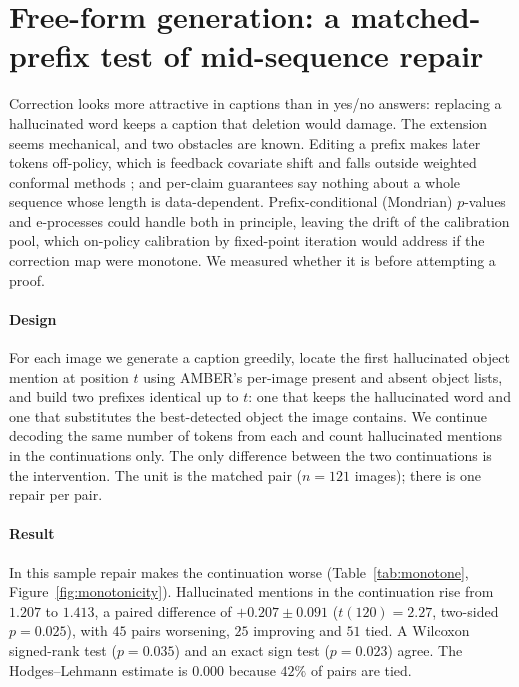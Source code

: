\section{Free-form generation: a matched-prefix test of mid-sequence repair}
\label{sec:sequential}

Correction looks more attractive in captions than in yes/no answers: replacing a hallucinated word keeps a
caption that deletion would damage. The extension seems mechanical, and two obstacles are known. Editing a prefix makes
later tokens off-policy, which is feedback covariate shift \citep{fannjiang2022fcs} and falls outside weighted conformal
methods \citep{tibshirani2019}; and per-claim guarantees say nothing about a whole sequence whose length is
data-dependent. Prefix-conditional (Mondrian) $p$-values and e-processes \citep{waudbysmith2024,ramdas2023} could
handle both in principle, leaving the drift of the calibration pool, which on-policy calibration by fixed-point
iteration would address if the correction map were monotone. We measured whether it is before attempting a proof.

\paragraph{Design}
For each image we generate a caption greedily, locate the first hallucinated object mention at position $t$ using AMBER's
per-image present and absent object lists, and build two prefixes identical up to $t$: one that keeps the hallucinated
word and one that substitutes the best-detected object the image contains. We continue decoding the same number of
tokens from each and count hallucinated mentions in the continuations only. The only difference between the two
continuations is the intervention. The unit is the matched pair ($n=121$ images); there is one repair per pair.

\paragraph{Result}
In this sample repair makes the continuation worse (Table~\ref{tab:monotone}, Figure~\ref{fig:monotonicity}). Hallucinated mentions
in the continuation rise from $1.207$ to $1.413$, a paired difference of $+0.207\pm0.091$ ($t(120)=2.27$, two-sided
$p=0.025$), with $45$ pairs worsening, $25$ improving and $51$ tied. A Wilcoxon signed-rank test ($p=0.035$) and an exact sign test
($p=0.023$) agree. The Hodges--Lehmann estimate is $0.000$ because $42\%$ of pairs are tied.

